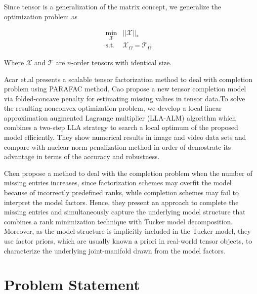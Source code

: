 \documentclass[letterpaper,12pt]{article}
\begin{document}
Since tensor is a generalization of the matrix concept, we generalize the  optimization problem as

\begin{equation} 
 \begin{split}
  \min_{\mathcal{X}} & ||\mathcal{X}||_*\\
  \text{s.t. } & \mathcal{X}_\Omega = \mathcal{T}_\Omega
 \end{split}
\end{equation}

Where $\mathcal{X}$ and $\mathcal{T}$ are $n$-order tensors with identical size.

Acar et.al \cite{Acar2011} presents a scalable tensor factorization method to deal with completion problem using PARAFAC method. Cao \cite{Cao2015} propose a new tensor completion model via folded-concave penalty for estimating missing values in tensor data.To solve the resulting nonconvex optimization problem, we develop a local linear approximation augmented Lagrange multiplier (LLA-ALM) algorithm which combines a two-step LLA strategy to search a local optimum of the proposed model efficiently. They show numerical results in image and video data sets and compare with nuclear norm penalization method in order of demostrate its advantage in terms of the accuracy and robustness.


Chen \cite{Chen2014} propose a method to deal with the completion problem when the number of missing entries increases, since factorization schemes may overfit the model because of incorrectly predefined ranks, while completion schemes may fail to interpret the model factors.  
Hence, they present an approach to complete the missing entries and simultaneously capture the underlying model structure that combines a rank minimization technique with Tucker model decomposition. Moreover, as the model structure is implicitly included in the Tucker model, they  use factor priors, which are usually known a priori in real-world tensor objects, to characterize the underlying joint-manifold drawn from the model factors.





\section{Problem Statement}
\end{document}
